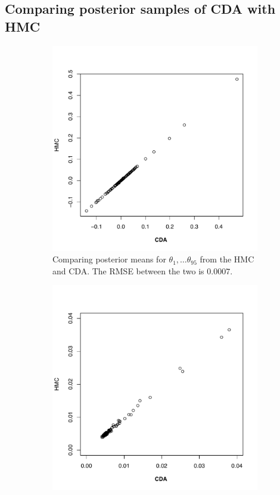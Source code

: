 \documentclass[10pt]{article}
\begin{document}
 \subsection{Comparing posterior samples of CDA with HMC}


\begin{figure}[H]
   \begin{subfigure}[b]{0.45\textwidth}
 \includegraphics[width=1\textwidth]{CDAvsHMC_mean.pdf}
 \caption{Comparing posterior means for $\theta_1,\dots \theta_{95}$ from the HMC and CDA. The  RMSE between the two is $0.0007$.}
 \end{subfigure}
  \hfill 
 \begin{subfigure}[b]{0.45\textwidth}
 \includegraphics[width=1\textwidth]{CDAvsHMC_sd.pdf}

\end{subfigure}
\end{figure}
\end{document}
